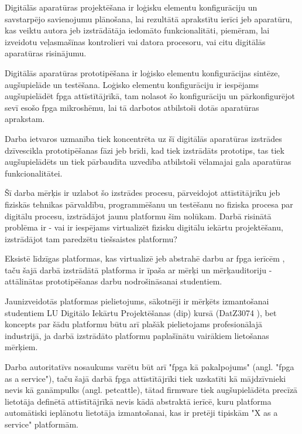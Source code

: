 Digitālās aparatūras projektēšana ir loģisku elementu konfigurāciju un
savstarpējo savienojumu plānošana, lai rezultātā aprakstītu ierīci jeb
aparatūru, kas veiktu autora jeb izstrādātāja iedomāto funkcionalitāti,
piemēram, lai izveidotu veļasmašīnas kontrolieri vai datora procesoru, vai citu
digitālās aparatūras risinājumu.  
  
Digitālās aparatūras prototipēšana ir loģisko elementu konfigurācijas sintēze,
augšupielāde un testēšana. Loģisko elementu konfigurāciju ir iespējams
augšupielādēt \gls{fpga} attīstītājrīkā, tam nolasot šo konfigurāciju un
pārkonfigurējot sevī esošo \gls{fpga} mikroshēmu, lai tā darbotos atbilstoši
dotās aparatūras aprakstam. \cite[para. II]{HerreraAlzu2013}  
  
Darba ietvaros uzmanība tiek koncentrēta uz šī digitālās aparatūras izstrādes
dzīvescikla prototipēšanas fāzi jeb brīdi, kad tiek izstrādāts
 prototips, tas tiek augšupielādēts
 un tiek pārbaudīta
 uzvedība atbilstoši vēlamajai gala aparatūras
funkcionalitātei.

Šī darba mērķis ir uzlabot šo izstrādes procesu, pārveidojot attīstītājrīku jeb
fiziskās tehnikas pārvaldību, programmēšanu un testēšanu no fiziska procesa par
digitālu procesu, izstrādājot jaunu platformu šim nolūkam. Darbā risinātā
problēma ir - vai ir iespējams virtualizēt fizisku digitālu iekārtu
projektēšanu, izstrādājot tam paredzētu tiešsaistes platformu?

Eksistē līdzīgas platformas, kas virtualizē jeb abstrahē darbu ar \gls{fpga}
ierīcēm \cite[para. I]{VaishnavAnuj2018}, taču šajā darbā izstrādātā platforma
ir īpaša ar mērķi un mērķauditoriju - attālinātas prototipēšanas darbu
nodrošināsanai studentiem. 

Jaunizveidotās platformas pielietojums, sākotnēji ir mērķēts izmantošanai
studentiem LU Digitālo Iekārtu Projektēšanas (\gls{dip}) kursā (DatZ3074
\cite{DatZ3074}), bet koncepts par šādu platformu būtu arī plašāk pielietojams
profesionālajā industrijā, ja darbā izstrādāto platformu paplašīnātu vairākiem
lietošanas mērķiem.

Darba autoritatīvs nosaukums varētu būt arī "\gls{fpga} kā pakalpojums" (angl.
"\gls{fpga} as a service"), taču šajā darbā \gls{fpga} attīstītājrīki tiek
uzskatīti kā mājdzīvnieki nevis kā ganāmpulks (angl. \gls{petcattle}), tātad
\gls{firmware} tiek augšupielādēta precīzā lietotāja definētā attīstītājrīkā
nevis kādā abstraktā ierīcē, kuru platforma automātiski ieplānotu lietotāja
izmantošanai, kas ir pretēji tipiskām "X as a service" platformām.

